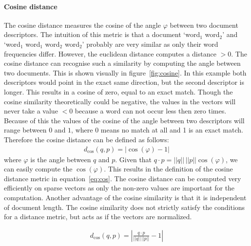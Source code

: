 \paragraph{Cosine distance} The cosine distance measures the cosine of the
angle $\varphi$ between two document descriptors. The intuition of this metric
is that a document `word$_1$ word$_2$' and `word$_1$ word$_1$ word$_2$
word$_2$' probably are very similar as only their word frequencies differ.
However, the euclidean distance computes a distance $> 0$. The cosine
distance can recognise such a similarity by computing the angle between two documents. This is shown visually in
figure~\ref{fig:cosine}. In this example both descriptors would point in the
exact same direction, but the second descriptor is longer.  This results in a
cosine of zero, equal to an exact match. Though the cosine similarity theoretically
could be negative, the values in the vectors will
never take a value $< 0$ because a word can not occur less then zero times.
Because of this the values of the cosine of the angle between two descriptors
will range between $0$ and $1$, where 0 means no match at all and 1 is an exact
match. Therefore the cosine distance can be defined as follows:
\begin{align*}
  d_\textrm{cos}(q,p) = |\cos(\varphi) - 1|
\end{align*}
where $\varphi$ is the angle between $q$ and $p$. Given that $q \cdot p = ||q||
\,||p|| \cos(\varphi)$, we can easily compute the $\cos(\varphi)$. This results
in the definition of the cosine distance metric in equation~\ref{eq:cos}. The cosine
distance can be computed very efficiently on sparse vectors as only the
non-zero values are important for the computation. Another advantage of the
cosine similarity is that it is independent of document length. The cosine
similarity does not strictly satisfy the conditions for a distance metric, but acts as if the vectors are normalized.

\begin{align}
  d_\textrm{cos}(q,p) = \left| \frac{q \cdot p}{||q||\,||p||} - 1\right| \label{eq:cos}
\end{align}

